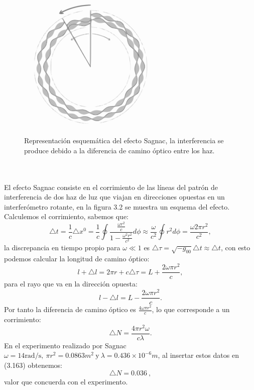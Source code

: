 \begin{figure}[h!]
\centering
\includegraphics[width=7cm]{Imagenes/Fig18}
\caption[Representación esquemática del efecto Sagnac.]{Representación esquemática del efecto Sagnac, la interferencia se produce debido a la diferencia de camino óptico entre los haz.}
\end{figure}
\\
\\
El efecto Sagnac consiste en el corrimiento de las líneas del patrón de interferencia de dos haz de luz que viajan en direcciones opuestas en un interferómetro rotante, en la figura 3.2 se muestra un esquema del efecto. Calculemos el corrimiento, sabemos que:
\begin{equation}
\triangle t=\frac{1}{c}\triangle x^{0}=\frac{1}{c}\oint\frac{\frac{\omega r^{2}}{c}}{1-\frac{\omega^{2}r^{2}}{c^{2}}}d\phi\approx\frac{\omega}{c^{2}}\oint r^{2}d\phi=\frac{\omega2\pi r^{2}}{c^{2}},
\end{equation}
la discrepancia en tiempo propio para $\omega \ll 1$ es $\triangle \tau =\sqrt{-g_{00}}\triangle t\approx \triangle t$, con esto podemos calcular la longitud de camino óptico:
\begin{equation}
l+\triangle l=2\pi r+c\triangle \tau =L+\frac{2\omega \pi r^2}{c},
\end{equation}  
para el rayo que va en la dirección opuesta:
\begin{equation}
l-\triangle l=L-\frac{2\omega \pi r^2}{c}.
\end{equation}
Por tanto la diferencia de camino óptico es $\frac{4\omega \pi r^2}{c}$, lo que corresponde a un corrimiento:
\begin{equation}
\triangle N= \frac{4\pi r^2\omega}{c\lambda}.
\end{equation}
En el experimento realizado por Sagnac $\omega=14\text{rad/s},\ \pi r^2=0.0863 m^2\ \text{y}\ \lambda=0.436\times10^{-6}m$, al insertar estos datos en (3.163) obtenemos:
\begin{equation}
\triangle N=0.036\ ,
\end{equation}
valor que concuerda con el experimento.
